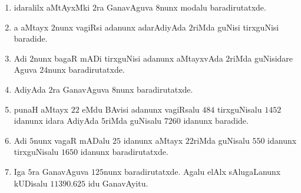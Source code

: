 \begin{enumerate}[\rm(1)]
\item idaralilx aMtAyxMki $2$ra GanavAguva $8$nunx modalu baradirutatxde.

\item a aMtayx $2$nunx vagiRsi adanunx adarAdiyAda $2$riMda guNisi tirxguNisi baradide.

\item Adi $2$nunx bagaR mADi tirxguNisi adanunx aMtayxvAda $2$riMda guNisidare Aguva $24$nunx baradirutatxde.

\item AdiyAda $2$ra GanavAguva $8$nunx baradirutatxde.

\item punaH aMtayx $22$ eMdu BAvisi adanunx  vagiRsalu $484$ tirxguNisalu $1452$ idanunx idara AdiyAda $5$riMda guNisalu $7260$ idanunx baradide.

\item Adi $5$nunx vagaR mADalu $25$ idanunx aMtayx $22$riMda guNisalu $550$ idanunx tirxguNisalu $1650$ idanunx baradirutatxde.

\item Iga $5$ra GanavAguva $125$nunx baradirutatxde. Agalu elAlx sAlugaLanunx kUDisalu $11390.625$ idu GanavAyitu.
\end{enumerate}
